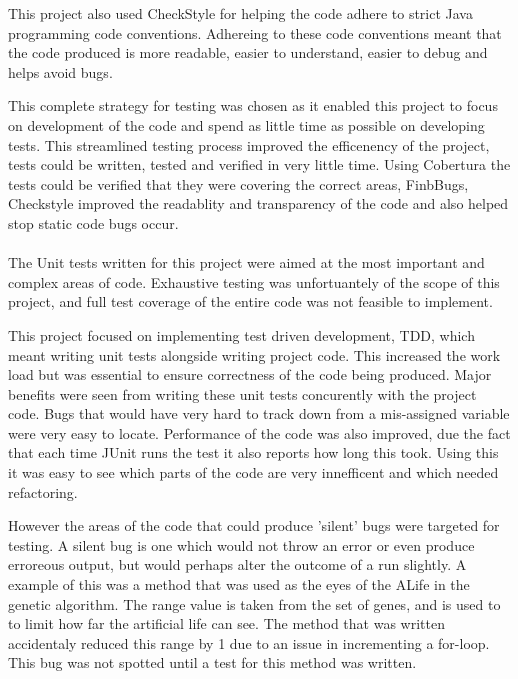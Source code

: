 \documentclass[12pt]{article}
\begin{document}
This project also used
CheckStyle for helping the code adhere to strict Java programming code conventions. Adhereing to these code conventions meant that
the code produced is more readable, easier to understand, easier to debug and helps avoid bugs.

This complete strategy for testing was chosen as it enabled this project to focus on development of the code and spend as little
time as possible on developing tests. This streamlined testing process improved the efficenency of the project, tests could 
be written, tested and verified in very little time. Using Cobertura the tests could be verified that they were covering the
correct areas, FinbBugs, Checkstyle improved the readablity and transparency of the code and also helped stop static code
bugs occur.


\paragraph{}

The Unit tests written for this project were aimed at the most important and complex areas of code. Exhaustive testing was 
unfortuantely of the scope of this project, and full test coverage of the entire code was not feasible to implement.

This project focused on implementing test driven development, TDD, which meant writing unit tests alongside writing project code.
This increased the work load but was essential to ensure correctness of the code being produced. Major benefits were seen from
writing these unit tests concurently with the project code. Bugs that would have very hard to track down from a mis-assigned
variable were very easy to locate. Performance of the code was also improved, due the fact that each time JUnit runs the test
it also reports how long this took. Using this it was easy to see which parts of the code are very innefficent and which needed
refactoring. 

However the 
areas of the code that could produce 'silent' bugs were targeted for testing. A silent bug is one which would not throw an error
or even produce erroreous output, but would perhaps alter the outcome of a run slightly. A example of this was a method that
was used as the eyes of the ALife in the genetic algorithm. The range value is taken from the set of genes, and is used to 
to limit how far the artificial life can see. The method that was written accidentaly reduced this range by 1 due to an issue
in incrementing a for-loop. This bug was not spotted until a test for this method was written. 
\end{document}
